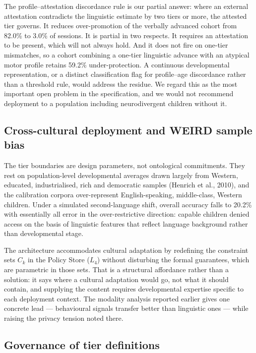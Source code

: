 \documentclass[fleqn,10pt]{wlscirep}
\begin{document}
The profile--attestation discordance rule is our partial answer: where an external attestation contradicts the linguistic estimate by two tiers or more, the attested tier governs. It reduces over-promotion of the verbally advanced cohort from 82.0\% to 3.0\% of sessions. It is partial in two respects. It requires an attestation to be present, which will not always hold. And it does not fire on one-tier mismatches, so a cohort combining a one-tier linguistic advance with an atypical motor profile retains 59.2\% under-protection. A continuous developmental representation, or a distinct classification flag for profile--age discordance rather than a threshold rule, would address the residue. We regard this as the most important open problem in the specification, and we would not recommend deployment to a population including neurodivergent children without it.

\subsection*{Cross-cultural deployment and WEIRD sample bias}

The tier boundaries are design parameters, not ontological commitments. They rest on population-level developmental averages drawn largely from Western, educated, industrialised, rich and democratic samples (Henrich et al., 2010)\cite{Henrich2010}, and the calibration corpora over-represent English-speaking, middle-class, Western children. Under a simulated second-language shift, overall accuracy falls to 20.2\% with essentially all error in the over-restrictive direction: capable children denied access on the basis of linguistic features that reflect language background rather than developmental stage.

The architecture accommodates cultural adaptation by redefining the constraint sets $C_k$ in the Policy Store ($L_4$) without disturbing the formal guarantees, which are parametric in those sets. That is a structural affordance rather than a solution: it says where a cultural adaptation would go, not what it should contain, and supplying the content requires developmental expertise specific to each deployment context. The modality analysis reported earlier gives one concrete lead --- behavioural signals transfer better than linguistic ones --- while raising the privacy tension noted there.

\subsection*{Governance of tier definitions}
\end{document}
